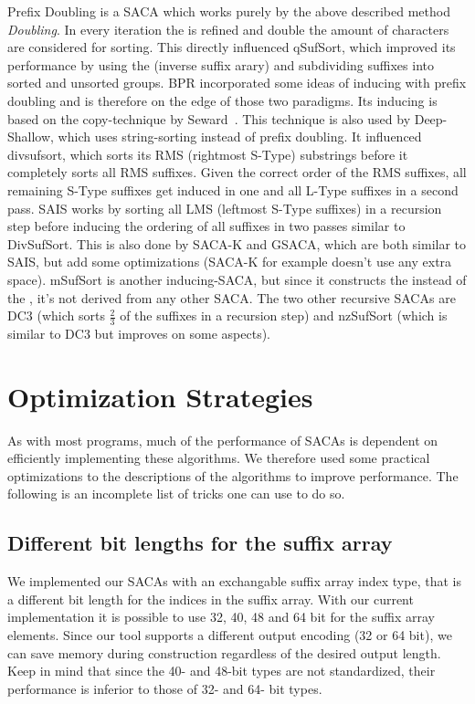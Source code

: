 Prefix Doubling is a SACA which works purely by the above described method \emph{Doubling}.
In every iteration the \sa is refined and double the amount of characters are considered for sorting.
This directly influenced qSufSort, which improved its performance by using the \isa (inverse suffix arary) 
and subdividing suffixes into sorted and unsorted groups. 
BPR incorporated some ideas of inducing with prefix doubling and is therefore on the edge of those two paradigms.
Its inducing is based on the copy-technique by Seward~\cite{seward2000}.
This technique is also used by Deep-Shallow, which uses string-sorting instead of prefix doubling.
It influenced divsufsort, which sorts its RMS (rightmost S-Type) substrings before it completely sorts all RMS suffixes.
Given the correct order of the RMS suffixes, all remaining S-Type suffixes get induced in one and all L-Type suffixes in a second pass.
SAIS works by sorting all LMS (leftmost S-Type suffixes) in a recursion step before inducing the ordering of all suffixes in two passes similar to DivSufSort.
This is also done by SACA-K and GSACA, which are both similar to SAIS, but add some optimizations
(SACA-K for example doesn't use any extra space).
mSufSort is another inducing-SACA, but since it constructs the \isa instead of the \sa,
it's not derived from any other SACA.
The two other recursive SACAs are DC3 (which sorts $\frac{2}{3}$ of the suffixes in a recursion step)
and nzSufSort (which is similar to DC3 but improves on some aspects).

\section{Optimization Strategies}

As with most programs, much of the performance of SACAs is dependent on efficiently implementing these algorithms.
We therefore used some practical optimizations to the descriptions of the algorithms to improve performance.
The following is an incomplete list of tricks one can use to do so.

\subsection{Different bit lengths for the suffix array}

We implemented our SACAs with an exchangable suffix array index type, that is a different bit length for the indices in the suffix array.
With our current implementation it is possible to use 32, 40, 48 and 64 bit for the suffix array elements.
Since our tool supports a different output encoding (32 or 64 bit), we can save memory during construction regardless of the desired output length.
Keep in mind that since the 40- and 48-bit types are not standardized, their performance is inferior to those of 32- and 64- bit types.

